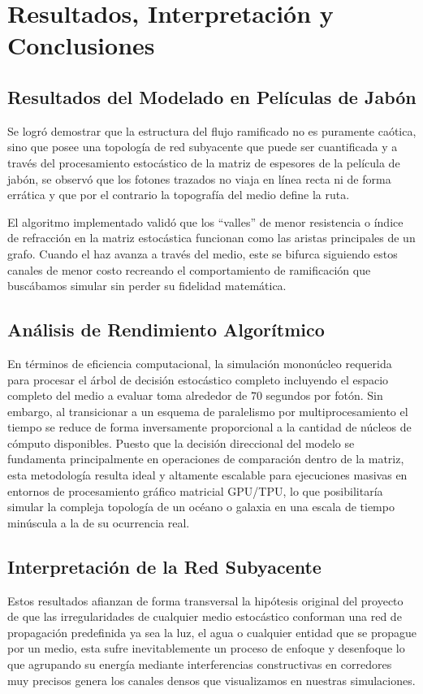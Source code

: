 \chapter{Resultados, Interpretación y Conclusiones}

\section{Resultados del Modelado en Películas de Jabón}
Se logró demostrar que la estructura del flujo ramificado no es puramente caótica, sino que posee una topología de red subyacente que puede ser cuantificada y a través del procesamiento estocástico de la matriz de espesores de la película de jabón, se observó que los fotones trazados no viaja en línea recta ni de forma errática y que por el contrario la topografía del medio define la ruta.

El algoritmo implementado validó que los ``valles'' de menor resistencia o índice de refracción en la matriz estocástica funcionan como las aristas principales de un grafo. Cuando el haz avanza a través del medio, este se bifurca siguiendo estos canales de menor costo recreando el comportamiento de ramificación que buscábamos simular sin perder su fidelidad matemática.

\section{Análisis de Rendimiento Algorítmico}
En términos de eficiencia computacional, la simulación mononúcleo requerida para procesar el árbol de decisión estocástico completo incluyendo el espacio completo del medio a evaluar toma alrededor de $70$ segundos por fotón. Sin embargo, al transicionar a un esquema de paralelismo por multiprocesamiento el tiempo se reduce de forma inversamente proporcional a la cantidad de núcleos de cómputo disponibles. Puesto que la decisión direccional del modelo se fundamenta principalmente en operaciones de comparación dentro de la matriz, esta metodología resulta ideal y altamente escalable para ejecuciones masivas en entornos de procesamiento gráfico matricial GPU/TPU, lo que posibilitaría simular la compleja topología de un océano o galaxia en una escala de tiempo minúscula a la de su ocurrencia real.

\section{Interpretación de la Red Subyacente}
Estos resultados afianzan de forma transversal la hipótesis original del proyecto de que las irregularidades de cualquier medio estocástico conforman una red de propagación predefinida ya sea la luz, el agua o cualquier entidad que se propague por un medio, esta sufre inevitablemente un proceso de enfoque y desenfoque lo que agrupando su energía mediante interferencias constructivas en corredores muy precisos genera los canales densos que visualizamos en nuestras simulaciones.

